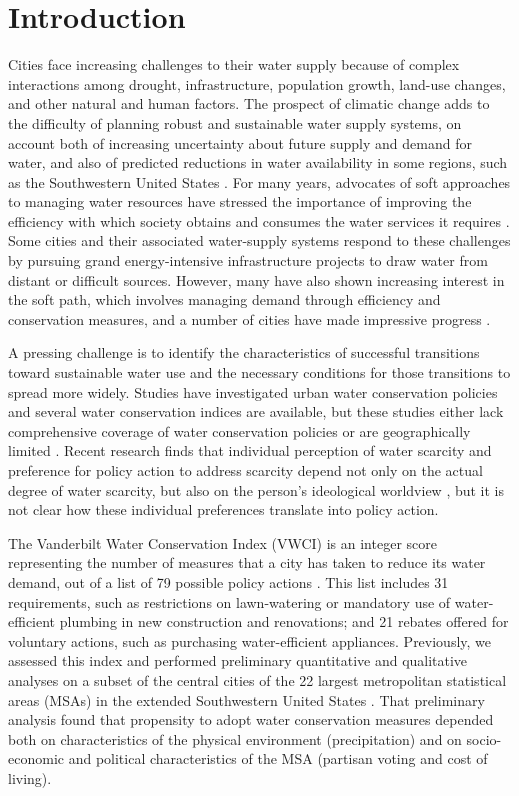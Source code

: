 \documentclass[draft,linenumbers]{agujournal}
\begin{document}
\section{Introduction}
Cities face increasing challenges to their water supply because of complex
interactions among drought, infrastructure, population growth, land-use changes,
and other natural and human factors.
The prospect of climatic change adds to the difficulty of planning robust and
sustainable water supply systems, on account both of  increasing uncertainty
about future supply and demand for water, and also of predicted reductions in
water availability in some regions, such as the Southwestern United States
\citep{gcrp:natl.assessment.3:2014}.
For many years, advocates of soft approaches to managing water resources have
stressed the importance of improving  the efficiency with which society obtains
and consumes
the water services it requires  \citep{gleick:soft.water.paths:2002}.
Some cities and their associated water-supply systems respond to these
challenges by pursuing grand energy-intensive infrastructure projects to draw
water from distant or difficult sources. However,
many have also shown increasing
interest in the soft path, which involves
managing demand through efficiency and conservation
measures, and a number of cities have made impressive progress
\citep{fleck:fighting:2016}.

A pressing challenge is to identify the characteristics of successful
transitions toward sustainable water use and the necessary conditions for those
transitions to spread more widely.
Studies have investigated urban water conservation policies and several water
conservation indices are available, but these studies either lack comprehensive coverage
of water conservation policies or are geographically limited
\citep{hess:vwci:2017,sauri:conservation:2013,maggioni:conservation:2014}.
Recent research finds that individual perception of water scarcity and
preference for policy action to address scarcity depend not only on the actual
degree of water scarcity, but also on the person's ideological worldview
\citep{switzer:green.lenses:2016}, but it is not clear how these individual
preferences translate into policy action.

The Vanderbilt Water Conservation Index (VWCI) is an integer score representing
the number of measures that a city has taken to reduce its water demand, out of
a list of 79 possible policy actions
\citep{hornberger:hydrological.transitions:2015,hess:drought:2016,hess:vwci:2017}.
This list includes 31 requirements, such as restrictions on
lawn-watering or mandatory use of water-efficient plumbing in new construction
and renovations; and 21 rebates offered for voluntary actions, such
as purchasing water-efficient appliances.
Previously, we assessed this index and performed preliminary quantitative and
qualitative analyses on a subset of the central cities of the 22 largest
metropolitan statistical areas (MSAs) in the extended Southwestern United States
\citep{hess:drought:2016}.
That preliminary analysis found that propensity to
adopt water conservation measures depended both on characteristics
of the physical environment (precipitation) and on socio-economic and political
characteristics of the MSA (partisan voting and cost of living).
\end{document}
